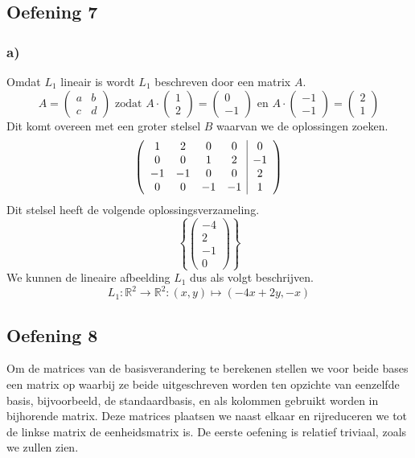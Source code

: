 \documentclass[lineaire_algebra_oplossingen.tex]{subfiles}
\begin{document}
\subsection{Oefening 7}
\subsubsection*{a)}
Omdat $L_1$ lineair is wordt $L_1$ beschreven door een matrix $A$.
\[
A = 
\begin{pmatrix}
a & b \\
c & d
\end{pmatrix}
\text{ zodat }
A
\cdot
\begin{pmatrix}1\\2\end{pmatrix}
=\begin{pmatrix}0\\-1\end{pmatrix}
\text{ en }
A
\cdot
\begin{pmatrix}-1\\-1\end{pmatrix}
=\begin{pmatrix}2\\1\end{pmatrix}
\]
Dit komt overeen met een groter stelsel $B$ waarvan we de oplossingen zoeken.
\[
\left(
\begin{array}{c c c c | c}
1 & 2 & 0 & 0 & 0\\
0 & 0 & 1 & 2 & -1\\
-1 & -1 & 0 & 0 & 2\\
0 & 0 & -1 & -1 & 1\\
\end{array}
\right)
\]
Dit stelsel heeft de volgende oplossingsverzameling.
\[
\left\lbrace
\begin{pmatrix}
-4\\2\\-1\\0
\end{pmatrix}
\right\rbrace
\]
We kunnen de lineaire afbeelding $L_1$ dus als volgt beschrijven.
\[
L_1:\mathbb{R}^2\rightarrow\mathbb{R}^2: (x,y)\mapsto (-4x+2y,-x)
\]

\subsection{Oefening 8}
Om de matrices van de basisverandering te berekenen stellen we voor beide bases een matrix op waarbij ze beide uitgeschreven worden ten opzichte van eenzelfde basis, bijvoorbeeld, de standaardbasis, en als kolommen gebruikt worden in bijhorende matrix. Deze matrices plaatsen we naast elkaar en rijreduceren we tot de linkse matrix de eenheidsmatrix is. De eerste oefening is relatief triviaal, zoals we zullen zien.
\end{document}
